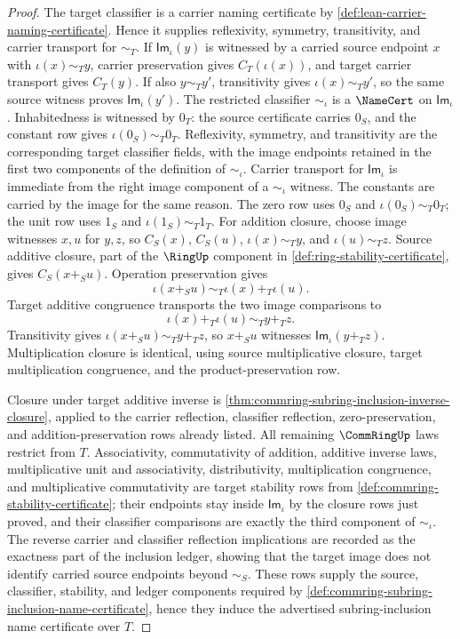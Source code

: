 \begin{proof}
The target classifier is a carrier naming certificate by \autoref{def:lean-carrier-naming-certificate}. Hence it supplies reflexivity, symmetry, transitivity, and carrier transport for $\sim_T$. If $\mathsf{Im}_{\iota}(y)$ is witnessed by a carried source endpoint $x$ with $\iota(x)\sim_T y$, carrier preservation gives $C_T(\iota(x))$, and target carrier transport gives $C_T(y)$. If also $y\sim_T y'$, transitivity gives $\iota(x)\sim_T y'$, so the same source witness proves $\mathsf{Im}_{\iota}(y')$.
The restricted classifier $\sim_{\iota}$ is a $\NameCert$ on $\mathsf{Im}_{\iota}$. Inhabitedness is witnessed by $0_T$: the source certificate carries $0_S$, and the constant row gives $\iota(0_S)\sim_T0_T$. Reflexivity, symmetry, and transitivity are the corresponding target classifier fields, with the image endpoints retained in the first two components of the definition of $\sim_{\iota}$. Carrier transport for $\mathsf{Im}_{\iota}$ is immediate from the right image component of a $\sim_{\iota}$ witness.
The constants are carried by the image for the same reason. The zero row uses $0_S$ and $\iota(0_S)\sim_T0_T$; the unit row uses $1_S$ and $\iota(1_S)\sim_T1_T$.
For addition closure, choose image witnesses $x,u$ for $y,z$, so $C_S(x)$, $C_S(u)$, $\iota(x)\sim_T y$, and $\iota(u)\sim_T z$. Source additive closure, part of the $\RingUp$ component in \autoref{def:ring-stability-certificate}, gives $C_S(x+_S u)$. Operation preservation gives
$$
\iota(x+_S u)\sim_T\iota(x)+_T\iota(u).
$$
Target additive congruence transports the two image comparisons to
$$
\iota(x)+_T\iota(u)\sim_T y+_T z.
$$
Transitivity gives $\iota(x+_S u)\sim_T y+_T z$, so $x+_S u$ witnesses $\mathsf{Im}_{\iota}(y+_T z)$. Multiplication closure is identical, using source multiplicative closure, target multiplication congruence, and the product-preservation row.

Closure under target additive inverse is \autoref{thm:commring-subring-inclusion-inverse-closure}, applied to the carrier reflection, classifier reflection, zero-preservation, and addition-preservation rows already listed.
All remaining $\CommRingUp$ laws restrict from $T$. Associativity, commutativity of addition, additive inverse laws, multiplicative unit and associativity, distributivity, multiplication congruence, and multiplicative commutativity are target stability rows from \autoref{def:commring-stability-certificate}; their endpoints stay inside $\mathsf{Im}_{\iota}$ by the closure rows just proved, and their classifier comparisons are exactly the third component of $\sim_{\iota}$. The reverse carrier and classifier reflection implications are recorded as the exactness part of the inclusion ledger, showing that the target image does not identify carried source endpoints beyond $\sim_S$.
These rows supply the source, classifier, stability, and ledger components required by \autoref{def:commring-subring-inclusion-name-certificate}, hence they induce the advertised subring-inclusion name certificate over $T$.
\end{proof}

